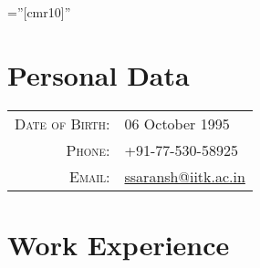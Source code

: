 \documentclass[a4paper,10pt]{article} %
\begin{document}
\pagestyle{empty} %

\font\fb=''[cmr10]'' %


\par{\bigskip\par}

\section{Personal Data}

\begin{tabular}{rl}
\textsc{Date of Birth:} & 06 October 1995 \\
\textsc{Phone:} & +91-77-530-58925 \\
\textsc{Email:} & \href{mailto:ssaransh@iitk.ac.in}{ssaransh@iitk.ac.in}
\end{tabular}


\section{Work Experience}
\end{document}
